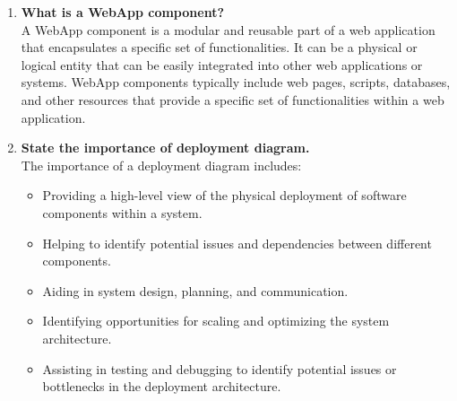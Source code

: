 \documentclass[11pt]{article}
\begin{document}
\begin{enumerate}
	\item \textbf{What is a WebApp component?}\\

	A WebApp component is a modular and reusable part of a web application that encapsulates a specific set of functionalities. It can be a physical or logical entity that can be easily integrated into other web applications or systems. WebApp components typically include web pages, scripts, databases, and other resources that provide a specific set of functionalities within a web application.


	\item \textbf{State the importance of deployment diagram.}\\
	      The importance of a deployment diagram includes:
	      \begin{itemize}
		      \item Providing a high-level view of the physical deployment of software components within a system.
		      \item Helping to identify potential issues and dependencies between different components.
		      \item Aiding in system design, planning, and communication.
		      \item Identifying opportunities for scaling and optimizing the system architecture.
		      \item Assisting in testing and debugging to identify potential issues or bottlenecks in the deployment architecture.
	      \end{itemize}

\end{enumerate}
\end{document}
